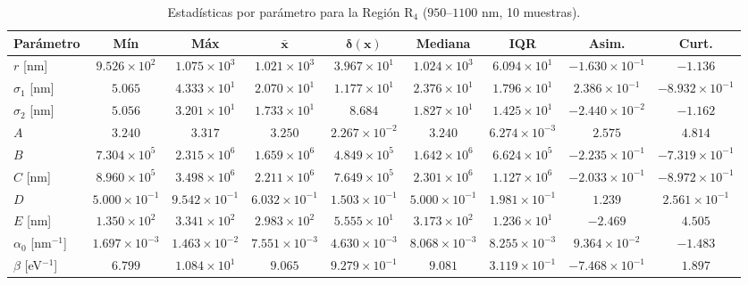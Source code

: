 \documentclass{article}
\begin{document}
\begin{table}[htbp]
\centering
\caption{Estad\'isticas por par\'ametro para la Regi\'on R$_4$ ($950$--$1100$ nm, 10 muestras).}
\label{tab:bin3}
\begin{tabular}{@{}lcccccccc@{}} %
\toprule
\textbf{Par\'ametro} & \textbf{M\'in} & \textbf{M\'ax} & $\boldsymbol{\bar{x}}$ & $\boldsymbol{\delta(x)}$ & \textbf{Mediana} & \textbf{IQR} & \textbf{Asim.} & \textbf{Curt.} \\
\midrule
$r$ [nm] & $9.526 \times 10^2$ & $1.075 \times 10^3$ & $1.021 \times 10^3$ & $3.967 \times 10^1$ & $1.024 \times 10^3$ & $6.094 \times 10^1$ & $-1.630 \times 10^{-1}$ & $-1.136$ \\
$\sigma_{1}$ [nm] & $5.065$ & $4.333 \times 10^1$ & $2.070 \times 10^1$ & $1.177 \times 10^1$ & $2.376 \times 10^1$ & $1.796 \times 10^1$ & $2.386 \times 10^{-1}$ & $-8.932 \times 10^{-1}$ \\
$\sigma_{2}$ [nm] & $5.056$ & $3.201 \times 10^1$ & $1.733 \times 10^1$ & $8.684$ & $1.827 \times 10^1$ & $1.425 \times 10^1$ & $-2.440 \times 10^{-2}$ & $-1.162$ \\
$A$ & $3.240$ & $3.317$ & $3.250$ & $2.267 \times 10^{-2}$ & $3.240$ & $6.274 \times 10^{-3}$ & $2.575$ & $4.814$ \\
$B$ & $7.304 \times 10^5$ & $2.315 \times 10^6$ & $1.659 \times 10^6$ & $4.849 \times 10^5$ & $1.642 \times 10^6$ & $6.624 \times 10^5$ & $-2.235 \times 10^{-1}$ & $-7.319 \times 10^{-1}$ \\
$C$ [nm] & $8.960 \times 10^5$ & $3.498 \times 10^6$ & $2.211 \times 10^6$ & $7.649 \times 10^5$ & $2.301 \times 10^6$ & $1.127 \times 10^6$ & $-2.033 \times 10^{-1}$ & $-8.972 \times 10^{-1}$ \\
$D$ & $5.000 \times 10^{-1}$ & $9.542 \times 10^{-1}$ & $6.032 \times 10^{-1}$ & $1.503 \times 10^{-1}$ & $5.000 \times 10^{-1}$ & $1.981 \times 10^{-1}$ & $1.239$ & $2.561 \times 10^{-1}$ \\
$E$ [nm] & $1.350 \times 10^2$ & $3.341 \times 10^2$ & $2.983 \times 10^2$ & $5.555 \times 10^1$ & $3.173 \times 10^2$ & $1.236 \times 10^1$ & $-2.469$ & $4.505$ \\
$\alpha_{0}$ [nm$^{-1}$] & $1.697 \times 10^{-3}$ & $1.463 \times 10^{-2}$ & $7.551 \times 10^{-3}$ & $4.630 \times 10^{-3}$ & $8.068 \times 10^{-3}$ & $8.255 \times 10^{-3}$ & $9.364 \times 10^{-2}$ & $-1.483$ \\
$\beta$ [eV$^{-1}$] & $6.799$ & $1.084 \times 10^1$ & $9.065$ & $9.279 \times 10^{-1}$ & $9.081$ & $3.119 \times 10^{-1}$ & $-7.468 \times 10^{-1}$ & $1.897$ \\

\end{tabular}
\end{table}
\end{document}
